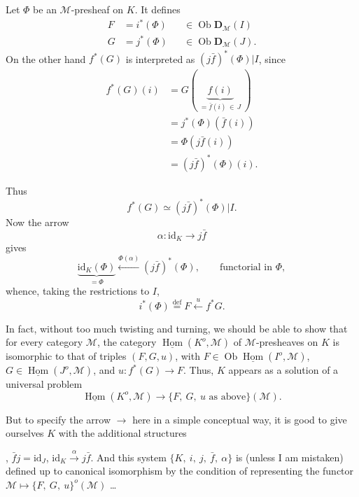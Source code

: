 \documentclass[11pt]{article}
\newcommand{\printedpage}[1]{\marginpar{\footnotesize p.~#1}}
\newcommand{\msp}[1]{\marginpar{\footnotesize [#1]}}
\newcommand{\uHom}{\underline{\operatorname{Hom}}}
\newcommand{\Ob}{\operatorname{Ob}}
\newcommand{\id}{\mathrm{id}}
\begin{document}
Let $\Phi$ be an $\mathcal{M}$-presheaf on $K$. It defines
\[
\begin{aligned}
F &= i^*(\Phi) && \in \Ob \mathbf{D}_{\mathcal{M}}(I)\\
G &= j^*(\Phi) && \in \Ob \mathbf{D}_{\mathcal{M}}(J).
\end{aligned}
\]
On the other hand $f^*(G)$ is interpreted as $(j\bar{f})^*(\Phi)|I$, since
\[
\begin{aligned}
f^*(G)(i) &= G(\ \underbrace{f(i)}_{= \bar{f}(i) \,\in\, J}\ )\\
&= j^*(\Phi)(\bar{f}(i))\\
&= \Phi(j\bar{f}(i))\\
&= (j\bar{f})^*(\Phi)(i).
\end{aligned}
\]

\msp{page 81}
Thus
\[ f^*(G) \simeq (j\bar{f})^*(\Phi)|I. \]
Now the arrow
\[ \alpha : \id_K \longrightarrow j\bar{f} \]
gives
\[ \underbrace{\id_K(\Phi)}_{= \Phi} \xleftarrow{\Phi(\alpha)} (j\bar{f})^*(\Phi), \qquad \text{functorial in } \Phi, \]
whence, taking the restrictions to $I$,
\[ i^*(\Phi) \overset{\text{def}}{=} F \xleftarrow{\ u\ } f^*G. \]

In fact, without too much twisting and turning, we should be able to show that for every category $\mathcal{M}$, the category $\uHom(K^o, \mathcal{M})$ of $\mathcal{M}$-presheaves on $K$ is isomorphic to that of triples $(F,G,u)$, with $F \in \Ob \uHom(I^o, \mathcal{M})$, $G \in \uHom(J^o, \mathcal{M})$, and $u : f^*(G) \longrightarrow F$. Thus, $K$ appears as a solution of a universal problem
\[ \uHom(K^o, \mathcal{M}) \longrightarrow \{F,\ G,\ u \text{ as above}\}(\mathcal{M}). \]

But to specify the arrow $\longrightarrow$ here in a simple conceptual way, it is good to give ourselves $K$ with the additional structures , $\bar{f}j = \id_J$, $\id_K \xrightarrow{\alpha} j\bar{f}$. And this system %
\printedpage{7}
\msp{page 82}
$\{K,\ i,\ j,\ \bar{f},\ \alpha\}$ is (unless I am mistaken) defined up to canonical isomorphism by the condition of representing the functor $\mathcal{M} \longmapsto \{F,\ G,\ u\}^o(\mathcal{M})$ \dots
\end{document}

